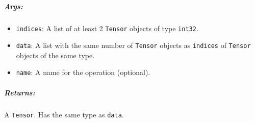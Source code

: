 \subparagraph{Args: }\label{args-25}

\begin{itemize}
\tightlist
\item
  \lstinline{indices}: A list of at least 2 \lstinline{Tensor} objects of type
  \lstinline{int32}.
\item
  \lstinline{data}: A list with the same number of \lstinline{Tensor} objects
  as \lstinline{indices} of \lstinline{Tensor} objects of the same type.
\item
  \lstinline{name}: A name for the operation (optional).
\end{itemize}

\subparagraph{Returns: }\label{returns-25}

A \lstinline{Tensor}. Has the same type as \lstinline{data}.
